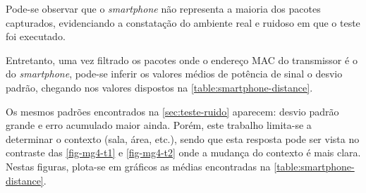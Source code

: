 \FloatBarrier

Pode-se observar que o \emph{smartphone} não representa a maioria dos pacotes
capturados, evidenciando a constatação do ambiente real e ruidoso em que o teste
foi executado.

Entretanto, uma vez filtrado os pacotes onde o endereço MAC do transmissor é o
do \emph{smartphone}, pode-se inferir os valores médios de potência de sinal o
desvio padrão, chegando nos valores dispostos na
\autoref{table:smartphone-distance}.

\begin{table}[htb]
\end{table}

Os mesmos padrões encontrados na \autoref{sec:teste-ruido} aparecem: desvio
padrão grande e erro acumulado maior ainda. Porém, este trabalho limita-se a
determinar o contexto (sala, área, etc.), sendo que esta resposta pode ser vista
no contraste das \autoref{fig-mg4-t1} e \autoref{fig-mg4-t2} onde a mudança do
contexto é mais clara. Nestas figuras, plota-se em gráficos as médias
encontradas na \autoref{table:smartphone-distance}.

